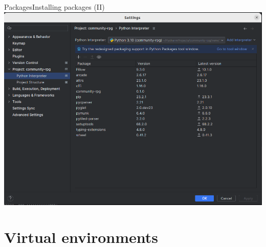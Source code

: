\documentclass[10pt,compress]{beamer} %
\begin{document}
\begin{frame}[fragile]{Packages}{Installing packages (II)}
	    \includegraphics[width=0.8\linewidth]{figs/packages}
\end{frame}

\section{Virtual environments}
\end{document}
